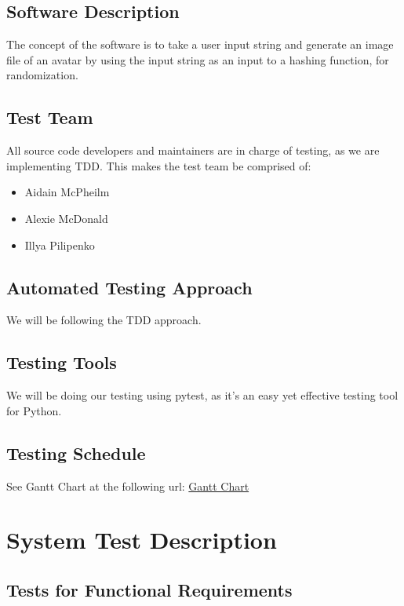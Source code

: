 \documentclass[12pt, titlepage]{article}
\begin{document}
\subsection{Software Description}
The concept of the software is to take a user input string and generate an image file of an
avatar by using the input string as an input to a hashing function, for randomization.

\subsection{Test Team}
All source code developers and maintainers are in charge of testing, as we are implementing TDD.
This makes the test team be comprised of:
\begin{itemize}
  \item Aidain McPheilm
  \item Alexie McDonald
  \item Illya Pilipenko
\end{itemize}


\subsection{Automated Testing Approach}
We will be following the TDD approach.

\subsection{Testing Tools}
We will be doing our testing using pytest, as it's an easy yet effective testing tool for Python.

\subsection{Testing Schedule}

See Gantt Chart at the following url: \href{https://gitlab.cas.mcmaster.ca/pilipeni/3XA3_Group_9/blob/master/ProjectSchedule/3XA3GanttProject.gan}{Gantt Chart}

\section{System Test Description}

\subsection{Tests for Functional Requirements}
\end{document}
